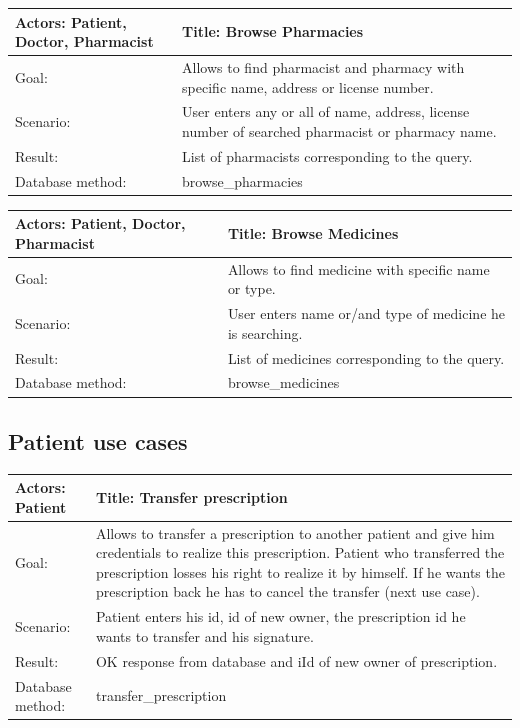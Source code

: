 \begin{table}[h]
    \begin{tabular}{| p{6cm} | p{7.75cm} |}
    \hline
    Actors: Patient, Doctor, Pharmacist &Title: Browse Pharmacies \\ \hline
    Goal: & Allows to find pharmacist and pharmacy with specific name, address or license number. \\ \hline
    Scenario: & User enters any or all of name, address, license number of searched pharmacist or pharmacy name. \\ \hline
    Result: & List of pharmacists corresponding to the query. \\ \hline
    Database  method: & browse\_pharmacies \\ \hline
    \end{tabular}
\end{table}

\begin{table}[h]
    \begin{tabular}{| p{6cm} | p{7.75cm} |}
    \hline
    Actors: Patient, Doctor, Pharmacist &Title: Browse Medicines \\ \hline
    Goal: & Allows to find medicine with specific name or type. \\ \hline
    Scenario: & User enters name or/and type of medicine he is searching. \\ \hline
    Result: & List of medicines corresponding to the query. \\ \hline
    Database  method: & browse\_medicines \\ \hline
    \end{tabular}
\end{table}

\subsection{Patient use cases}

\begin{table}[h]
    \begin{tabular}{| p{6cm} | p{7.75cm} |}
    \hline
    Actors: Patient &Title: Transfer prescription \\ \hline
    Goal: & Allows to transfer a prescription to another patient and give him credentials to realize this prescription. Patient who transferred the prescription losses his right to realize it by himself. If he wants the prescription back he has to cancel the transfer (next use case). \\ \hline
    Scenario: & Patient enters his id, id of new owner, the prescription id he wants to transfer and his signature. \\ \hline
    Result: & OK response from database and iId of new owner of prescription. \\ \hline
    Database  method: & transfer\_prescription \\ \hline
    \end{tabular}
\end{table}

